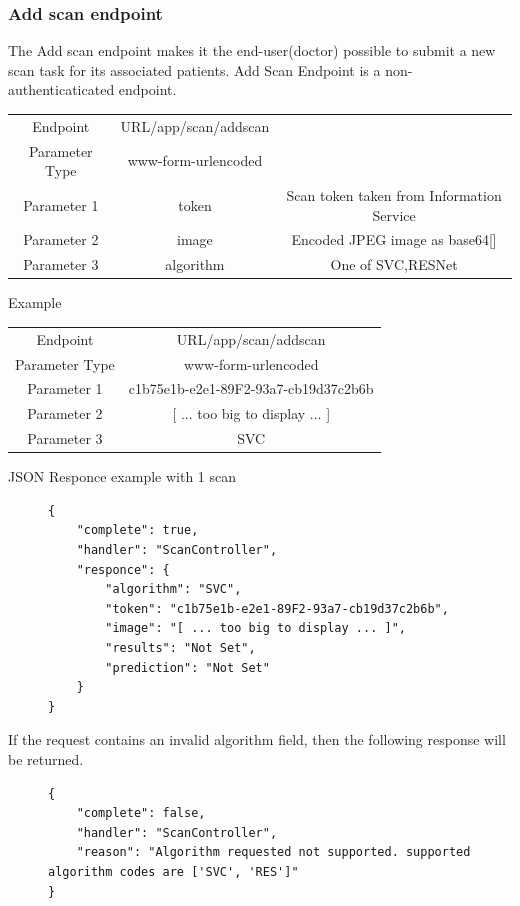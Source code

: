 				\subsubsection{Add scan endpoint}
					\label{add-scan-endpoint-taskbe}
					The Add scan endpoint makes it the end-user(doctor) possible to submit a new scan task for its associated 
					patients. Add Scan Endpoint is a non-authenticaticated endpoint.
					\begin{center}
						\begin{tabular}{ |c|c|c| } 
							\hline
							Endpoint & {{URL}}/app/scan/addscan& \\
							Parameter Type & www-form-urlencoded  &\\
							Parameter 1 & token  &Scan token taken from Information Service\\
							Parameter 2 & image  &Encoded JPEG image as base64[\cite{base64-4648}]\\
							Parameter 3 & algorithm  & One of {SVC,RESNet}\\
							\hline
						\end{tabular}
					\end{center}
					Example
					\begin{center}
						\begin{tabular}{ |c|c| } 
							\hline
							Endpoint & {{URL}}/app/scan/addscan \\
							Parameter Type & www-form-urlencoded  \\
							Parameter 1 & c1b75e1b-e2e1-89F2-93a7-cb19d37c2b6b   \\
							Parameter 2 & [ ... too big to display ... ]  \\
							Parameter 3 & SVC\\
							\hline
						\end{tabular}
					\end{center}
					JSON Responce example with 1 scan
					\begin{figure}[H]
						\iftrue
						\begin{lstlisting}[]
{
	"complete": true,
	"handler": "ScanController",
	"responce": {
		"algorithm": "SVC",
		"token": "c1b75e1b-e2e1-89F2-93a7-cb19d37c2b6b",
		"image": "[ ... too big to display ... ]",
		"results": "Not Set",
		"prediction": "Not Set"
	}
}
						\end{lstlisting}
					\end{figure}
					If the request contains an invalid algorithm field, then the following response will be returned.
					\begin{figure}[H]
						\iftrue
						\begin{lstlisting}[]
{
	"complete": false,
	"handler": "ScanController",
	"reason": "Algorithm requested not supported. supported algorithm codes are ['SVC', 'RES']"
}
						\end{lstlisting}
					\end{figure}
